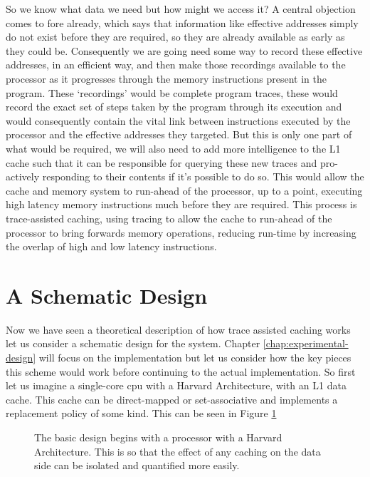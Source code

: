 So we know what data we need but how might we access it? A central objection comes to fore already, which says that information like effective addresses simply do not exist before they are required, so they are already available as early as they could be. Consequently we are going need some way to record these effective addresses, in an efficient way, and then make those recordings available to the processor as it progresses through the memory instructions present in the program. These `recordings' would be complete program traces, these would record the exact set of steps taken by the program through its execution and would consequently contain the vital link between instructions executed by the processor and the effective addresses they targeted. But this is only one part of what would be required, we will also need to add more intelligence to the L1 cache such that it can be responsible for querying these new traces and pro-actively responding to their contents if it's possible to do so. This would allow the cache and memory system to run-ahead of the processor, up to a point, executing high latency memory instructions much before they are required. This process is trace-assisted caching, using tracing to allow the cache to run-ahead of the processor to bring forwards memory operations, reducing run-time by increasing the overlap of high and low latency instructions.

\section{A Schematic Design}

Now we have seen a theoretical description of how trace assisted caching works let us consider a schematic design for the system. Chapter \ref{chap:experimental-design} will focus on the implementation but let us consider how the key pieces this scheme would work before continuing to the actual implementation. So first let us imagine a single-core \gls{cpu} with a Harvard Architecture, with an L1 data cache. This cache can be direct-mapped or set-associative and implements a replacement policy of some kind. This can be seen in Figure \ref{fig:base-architecture}

\begin{figure}[htbp]
	
	\caption[Basic Processor Architecture]{The basic design begins with a processor with a Harvard Architecture. This is so that the effect of any caching on the data side can be isolated and quantified more easily.}
	\label{fig:base-architecture}
\end{figure}

